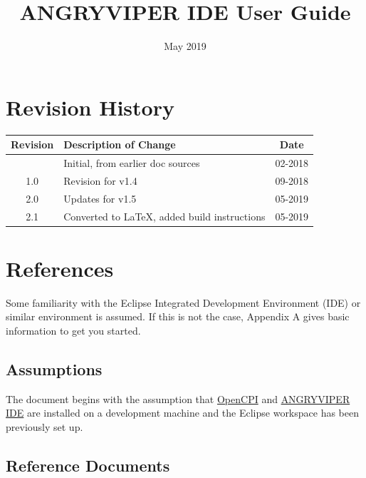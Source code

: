 \documentclass[10pt, a4paper, oneside]{article}
\begin{document}
\title {ANGRYVIPER IDE User Guide}
\author{}
\date{May 2019} %
\begin{titlepage}
\maketitle{} %
\end{titlepage}

\section{Revision History}
\renewcommand{\arraystretch}{2}
\begin{tabular}{|c|p{11cm}|c|}
\hline
Revision & Description of Change & Date\\
\hline
& Initial, from earlier doc sources & 02-2018\\ \hline
1.0 & Revision for v1.4& 09-2018\\  \hline
2.0 & Updates for v1.5 & 05-2019 \\\hline
2.1 & Converted to \LaTeX, added build instructions & 05-2019\\
\hline
\end{tabular}

\setcounter{tocdepth}{2}
\tableofcontents
{}
\newpage
\listoftables
\listoffigures
\newpage
{}
\section{References}
Some familiarity with the Eclipse Integrated Development Environment (IDE) or similar environment is assumed. If this is not the case, Appendix A gives basic information to get you started.

\subsection{Assumptions}
The document begins with the assumption that \href{https://github.com/opencpi/opencpi}{OpenCPI} and \href{https://github.com/opencpi/angryviper_gui}{ANGRYVIPER IDE} are installed on a development machine and the Eclipse workspace has been previously set up.
\subsection{Reference Documents}
\def\myreferences{
\hline
OpenCPI Website &
\href{https://www.opencpi.org}{www.opencpi.org} \\
\hline
OpenCPI Component Development Guide &
\githubio{OpenCPI\_Component\_Development.pdf} \\
\hline
OpenCPI Application Development Guide &
\githubio{OpenCPI\_Application\_Development.pdf} \\
}

\end{document}
